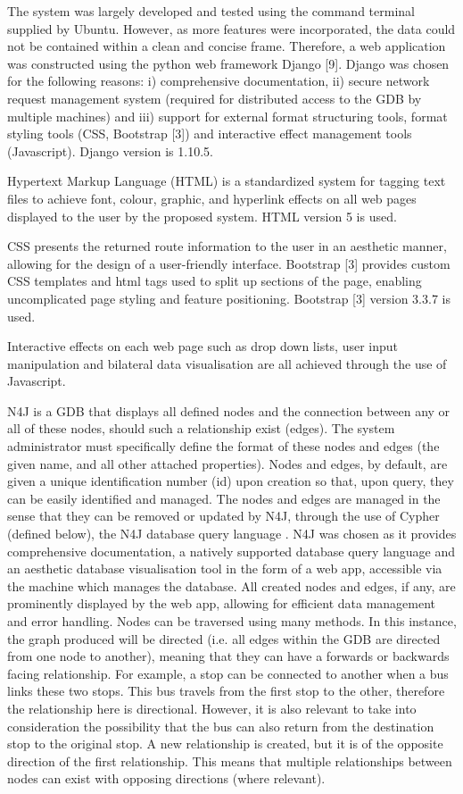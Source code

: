 \documentclass[12pt]{article}   	%
\begin{document}
The system was largely developed and tested using the command terminal supplied by Ubuntu. However, as more features were incorporated, the data could not be contained within a clean and concise frame. Therefore, a web application was constructed using the python web framework Django [9]. Django was chosen for the following reasons: i) comprehensive documentation, ii) secure network request management system (required for distributed access to the GDB by multiple machines) and iii) support for external format structuring tools, format styling tools (CSS, Bootstrap [3]) and interactive effect management tools (Javascript). Django version is 1.10.5.

Hypertext Markup Language (HTML) is a standardized system for tagging text files to achieve font, colour, graphic, and hyperlink effects on all web pages displayed to the user by the proposed system. HTML version 5 is used.

CSS presents the returned route information to the user in an aesthetic manner, allowing for the design of a user-friendly interface. Bootstrap [3] provides custom CSS templates and html tags used to split up sections of the page, enabling uncomplicated page styling and feature positioning. Bootstrap [3] version 3.3.7 is used.

Interactive effects on each web page such as drop down lists, user input manipulation and bilateral data visualisation are all achieved through the use of Javascript.

N4J is a GDB that displays all defined nodes and the connection between any or all of these nodes, should such a relationship exist (edges). The system administrator must specifically define the format of these nodes and edges (the given name, and all other attached properties). Nodes and edges, by default, are given a unique identification number (id) upon creation so that, upon query, they can be easily identified and managed. The nodes and edges are managed in the sense that they can be removed or updated by N4J, through the use of Cypher (defined below), the N4J database query language . N4J was chosen as it provides comprehensive documentation, a natively supported database query language and an aesthetic database visualisation tool in the form of a web app, accessible via the machine which manages the database. All created nodes and edges, if any, are prominently displayed by the web app, allowing for efficient data management and error handling. Nodes can be traversed using many methods. In this instance, the graph produced will be directed (i.e. all edges within the GDB are directed from one node to another), meaning that they can have a forwards or backwards facing relationship. For example, a stop can be connected to another when a bus links these two stops. This bus travels from the first stop to the other, therefore the relationship here is directional. However, it is also relevant to take into consideration the possibility that the bus can also return from the destination stop to the original stop. A new relationship is created, but it is of the opposite direction of the first relationship. This means that multiple relationships between nodes can exist with opposing directions (where relevant).
\end{document}
